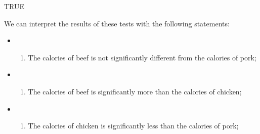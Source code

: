 \documentclass[11pt]{article}
\providecommand{\tightlist}{%
      \setlength{\itemsep}{0pt}\setlength{\parskip}{0pt}}
\begin{document}
    
    TRUE

    
    We can interpret the results of these tests with the following
statements:

\begin{itemize}
\item
  \begin{enumerate}
  \def\labelenumi{\arabic{enumi}.}
  \tightlist
  \item
    The calories of beef is not significantly different from the
    calories of pork;
  \end{enumerate}
\item
  \begin{enumerate}
  \def\labelenumi{\arabic{enumi}.}
  \setcounter{enumi}{1}
  \tightlist
  \item
    The calories of beef is significantly more than the calories of
    chicken;
  \end{enumerate}
\item
  \begin{enumerate}
  \def\labelenumi{\arabic{enumi}.}
  \setcounter{enumi}{2}
  \tightlist
  \item
    The calories of chicken is significantly less than the calories of
    pork;
  \end{enumerate}
\end{itemize}


    
    
    
    
\end{document}
